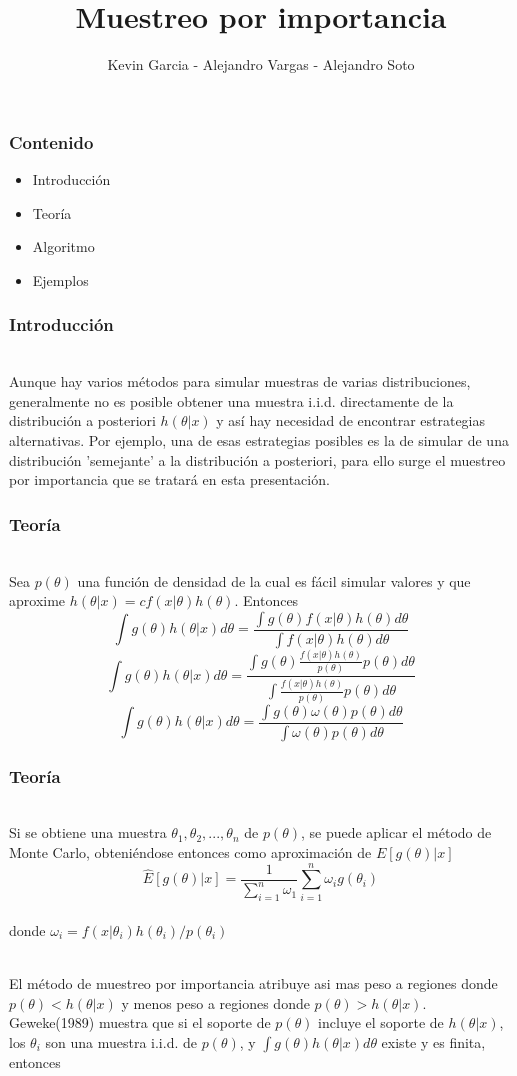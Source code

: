 \documentclass[12pt]{beamer}
\author{Kevin Garcia - Alejandro Vargas - Alejandro Soto}
\title{Muestreo por importancia}
\begin{document}
\begin{frame}
\titlepage
\end{frame}

\begin{frame}
\frametitle{Contenido}
\begin{itemize}
\item Introducción
\item Teoría
\item Algoritmo
\item Ejemplos
\end{itemize}
\end{frame}

\begin{frame}
\frametitle{Introducción}
~\\Aunque hay varios métodos para simular muestras de varias distribuciones, generalmente no es posible obtener una muestra i.i.d. directamente de la distribución a posteriori $h(\theta|x)$ y así hay necesidad de encontrar estrategias alternativas. Por ejemplo, una de esas estrategias posibles es la de simular de una distribución 'semejante' a la distribución a posteriori, para ello surge el muestreo por importancia que se tratará en esta presentación.
\end{frame}

\begin{frame}
\frametitle{Teoría}
~\\Sea $p(\theta)$ una función de densidad de la cual es fácil simular valores y que aproxime $h(\theta|x)=cf(x|\theta)h(\theta)$. Entonces
$$\int g(\theta)h(\theta|x)d\theta=\frac{\int g(\theta)f(x|\theta)h(\theta)d\theta}{\int f(x|\theta)h(\theta)d\theta}$$
$$\int g(\theta)h(\theta|x)d\theta=\frac{\int g(\theta)\frac{f(x|\theta)h(\theta)}{p(\theta)}p(\theta)d\theta}{\int\frac{f(x|\theta)h(\theta)}{p(\theta)}p(\theta)d\theta}$$
$$\int g(\theta)h(\theta|x)d\theta=\frac{\int g(\theta)\omega(\theta)p(\theta)d\theta}{\int \omega(\theta)p(\theta)d\theta}$$
\end{frame}

\begin{frame}
\frametitle{Teoría}
~\\ Si se obtiene una muestra $\theta_{1},\theta_{2},...,\theta_{n}$ de $p(\theta)$, se puede aplicar el método de Monte Carlo, obteniéndose entonces como aproximación de $E[g(\theta)|x]$
$$\hat{E}[g(\theta)|x]=\frac{1}{\sum\limits_{i=1}^{n}\omega_{1}}\sum\limits_{i=1}^{n}\omega_{i}g(\theta_{i})$$
~\\donde $\omega_{i}=f(x|\theta_{i})h(\theta_{i})/p(\theta_{i})$

~\\El método de muestreo por importancia atribuye asi mas peso a regiones donde $p(\theta)<h(\theta|x)$ y menos peso a regiones donde $p(\theta)>h(\theta|x)$. Geweke(1989) muestra que si el soporte de $p(\theta)$ incluye el soporte de $h(\theta|x)$, los $\theta_{i}$ son una muestra i.i.d. de $p(\theta)$, y $\int g(\theta)h(\theta|x)d\theta$ existe y es finita, entonces
\end{frame}
\end{document}
